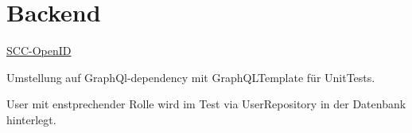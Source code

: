 \section{Backend}


    \begin{frame}%
        \href{https://www.scc.kit.edu/dienste/openid-connect.php}{SCC-OpenID}
    \end{frame}

    \begin{frame}%
        Umstellung auf GraphQl-dependency mit GraphQLTemplate für UnitTests. 
    \end{frame}

    \begin{frame}%
        User mit enstprechender Rolle wird im Test via UserRepository in der Datenbank hinterlegt.
    \end{frame}

    \begin{frame}
    \end{frame}